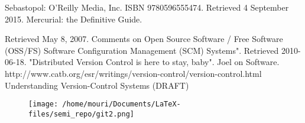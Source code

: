 \documentclass[twoside]{article}
\begin{document}
\begin{multicols}{2}
\begin{thebibliography}{99} %
 
Sebastopol: O'Reilly Media, Inc. ISBN 9780596555474. Retrieved 4 September 2015.
\newblock Mercurial: the Definitive Guide.
 
Retrieved May 8, 2007.
\newblock Comments on Open Source Software / Free Software (OSS/FS) Software Configuration Management (SCM) Systems".
Retrieved 2010-06-18.
\newblock "Distributed Version Control is here to stay, baby". Joel on Software.
http://www.catb.org/esr/writings/version-control/version-control.html\\
\newblock Understanding Version-Control Systems (DRAFT)
\end{thebibliography}

\begin{figure}[H]
\centering
\texttt{[image: /home/mouri/Documents/LaTeX-files/semi\_repo/git2.png]}
\end{figure}



\end{multicols}
\end{document}
